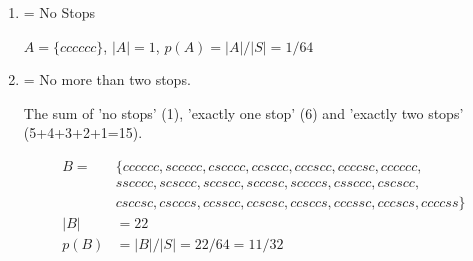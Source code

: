 \documentclass[10pt,a4paper]{report}
\begin{document}
\begin{enumerate}[label=\Alph*]
	\item = No Stops

		$A = \{ cccccc \}$, $|A| = 1$, $ p(A) = |A|/|S| = 1/64$	
	
	\item = No more than two stops.
	
	The sum of 'no stops' (1), 'exactly one stop' (6) and 'exactly two stops' (5+4+3+2+1=15).
	
	\begin{align*}
		B = &\{ cccccc, sccccc, cscccc, ccsccc, cccscc, ccccsc, cccccc, \\
		&sscccc, scsccc, sccscc, scccsc, sccccs, cssccc, cscscc, \\
		&csccsc, cscccs, ccsscc, ccscsc, ccsccs, cccssc, cccscs, ccccss \} \\
		|B| &= 22\\
		p(B) &= |B|/|S| = 22/64 = 11/32
	\end{align*}
	
\end{enumerate}
\end{document}
